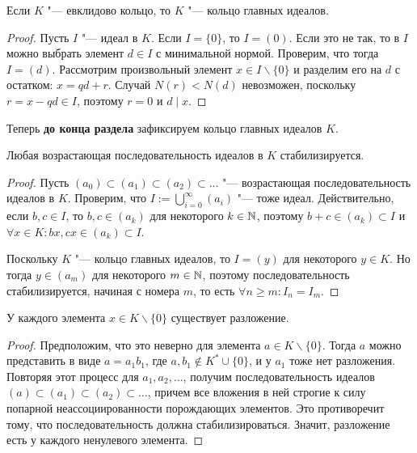 \begin{theorem}
	Если $K$ "--- евклидово кольцо, то $K$ "--- кольцо главных идеалов.
\end{theorem}

\begin{proof}
	Пусть $I$ "--- идеал в $K$. Если $I = \{0\}$, то $I = (0)$. Если это не так, то в $I$ можно выбрать элемент $d \in I$ с минимальной нормой. Проверим, что тогда $I = (d)$. Рассмотрим произвольный элемент $x \in I \backslash \{0\}$ и разделим его на $d$ с остатком: $x = qd + r$. Случай $N(r) < N(d)$ невозможен, поскольку $r = x - qd \in I$, поэтому $r = 0$ и $d \mid x$.
\end{proof}

Теперь \textbf{до конца раздела} зафиксируем кольцо главных идеалов $K$.

\begin{proposition}
	Любая возрастающая последовательность идеалов в $K$ стабилизируется.
\end{proposition}

\begin{proof}
	Пусть $(a_0) \subset (a_1) \subset (a_2) \subset \dotsc$ "--- возрастающая последовательность идеалов в $K$. Проверим, что $I := \bigcup_{i = 0}^\infty (a_i)$ "--- тоже идеал. Действительно, если $b, c \in I$, то $b, c \in (a_k)$ для некоторого $k \in \mathbb{N}$, поэтому $b + c \in (a_k) \subset I$ и $\forall x \in K: bx, cx \in (a_k) \subset I$.
	
	Поскольку $K$ "--- кольцо главных идеалов, то $I = (y)$ для некоторого $y \in K$. Но тогда $y \in (a_m)$ для некоторого $m \in \mathbb{N}$, поэтому последовательность стабилизируется, начиная с номера $m$, то есть $\forall n \ge m: I_n = I_m$.
\end{proof}

\begin{proposition}
	У каждого элемента $x \in K \backslash \{0\}$ существует разложение.
\end{proposition}

\begin{proof}
	Предположим, что это неверно для элемента $a \in K \backslash \{0\}$. Тогда $a$ можно представить в виде $a = a_1b_1$, где $a, b_1 \not\in K^* \cup \{0\}$, и у $a_1$ тоже нет разложения. Повторяя этот процесс для $a_1, a_2, \dotsc$, получим последовательность идеалов $(a) \subset (a_1) \subset (a_2) \subset \dots$, причем все вложения в ней строгие к силу попарной неассоциированности порождающих элементов. Это противоречит тому, что последовательность должна стабилизироваться. Значит, разложение есть у каждого ненулевого элемента.
\end{proof}

